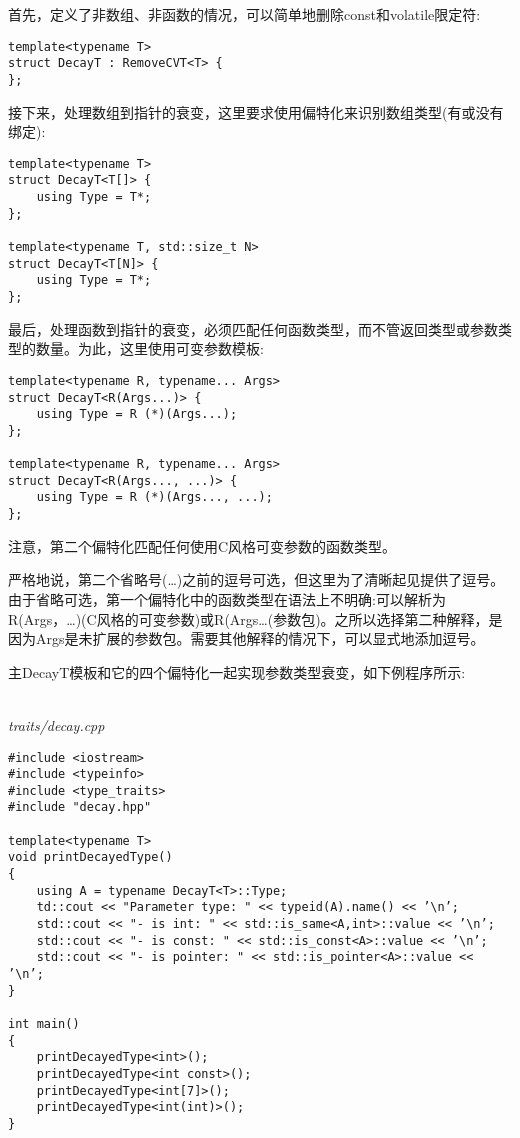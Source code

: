 首先，定义了非数组、非函数的情况，可以简单地删除const和volatile限定符:

\begin{lstlisting}[style=styleCXX]
template<typename T>
struct DecayT : RemoveCVT<T> {
};
\end{lstlisting}

接下来，处理数组到指针的衰变，这里要求使用偏特化来识别数组类型(有或没有绑定):

\begin{lstlisting}[style=styleCXX]
template<typename T>
struct DecayT<T[]> {
	using Type = T*;
};

template<typename T, std::size_t N>
struct DecayT<T[N]> {
	using Type = T*;
};
\end{lstlisting}

最后，处理函数到指针的衰变，必须匹配任何函数类型，而不管返回类型或参数类型的数量。为此，这里使用可变参数模板:

\begin{lstlisting}[style=styleCXX]
template<typename R, typename... Args>
struct DecayT<R(Args...)> {
	using Type = R (*)(Args...);
};

template<typename R, typename... Args>
struct DecayT<R(Args..., ...)> {
	using Type = R (*)(Args..., ...);
};
\end{lstlisting}

注意，第二个偏特化匹配任何使用C风格可变参数的函数类型。

\begin{tcolorbox}[colback=webgreen!5!white,colframe=webgreen!75!black]
\hspace*{0.75cm}严格地说，第二个省略号(…)之前的逗号可选，但这里为了清晰起见提供了逗号。由于省略可选，第一个偏特化中的函数类型在语法上不明确:可以解析为R(Args，…)(C风格的可变参数)或R(Args…(参数包)。之所以选择第二种解释，是因为Args是未扩展的参数包。需要其他解释的情况下，可以显式地添加逗号。
\end{tcolorbox}

主DecayT模板和它的四个偏特化一起实现参数类型衰变，如下例程序所示:

\hspace*{\fill} \\ %
\noindent
\textit{traits/decay.cpp}
\begin{lstlisting}[style=styleCXX]
#include <iostream>
#include <typeinfo>
#include <type_traits>
#include "decay.hpp"

template<typename T>
void printDecayedType()
{
	using A = typename DecayT<T>::Type;
	td::cout << "Parameter type: " << typeid(A).name() << ’\n’;
	std::cout << "- is int: " << std::is_same<A,int>::value << ’\n’;
	std::cout << "- is const: " << std::is_const<A>::value << ’\n’;
	std::cout << "- is pointer: " << std::is_pointer<A>::value << ’\n’;
}

int main()
{
	printDecayedType<int>();
	printDecayedType<int const>();
	printDecayedType<int[7]>();
	printDecayedType<int(int)>();
}
\end{lstlisting}

